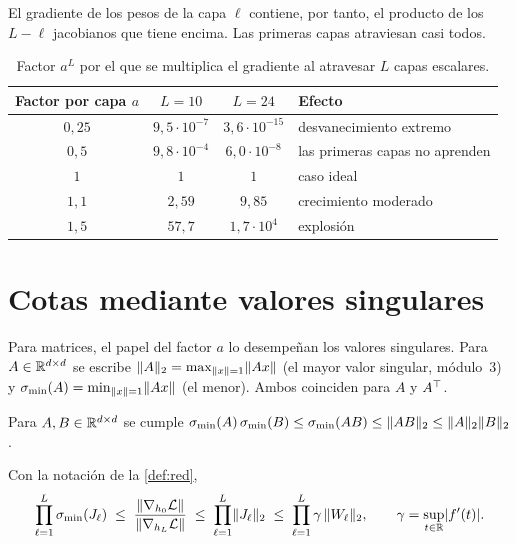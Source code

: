 El gradiente de los pesos de la capa $\ell$ contiene, por tanto, el producto de los $L-\ell$ jacobianos que tiene encima. Las primeras capas atraviesan casi todos.

\addtocounter{definicion}{1}%

\begin{table}[h]
\centering
\begin{tabular}{@{}cccl@{}}
\toprule
Factor por capa $a$ & $L=10$ & $L=24$ & Efecto \\
\midrule
$0{,}25$ & $9{,}5\cdot 10^{-7}$ & $3{,}6\cdot 10^{-15}$ & desvanecimiento extremo \\
$0{,}5$ & $9{,}8\cdot 10^{-4}$ & $6{,}0\cdot 10^{-8}$ & las primeras capas no aprenden \\
$1$ & $1$ & $1$ & caso ideal \\
$1{,}1$ & $2{,}59$ & $9{,}85$ & crecimiento moderado \\
$1{,}5$ & $57{,}7$ & $1{,}7\cdot 10^{4}$ & explosión \\
\bottomrule
\end{tabular}
\caption{Factor $a^{L}$ por el que se multiplica el gradiente al atravesar $L$ capas escalares.}
\label{tab:factores}
\end{table}

\section{Cotas mediante valores singulares}

Para matrices, el papel del factor $a$ lo desempeñan los valores singulares. Para $A\in\mathbb{R}^{d\times d}$ se escribe $\lVert A\rVert_2=\max_{\lVert x\rVert=1}\lVert Ax\rVert$ (el mayor valor singular, módulo~3) y $\sigma_{\min}(A)=\min_{\lVert x\rVert=1}\lVert Ax\rVert$ (el menor). Ambos coinciden para $A$ y $A^{\top}$.

\begin{lema}\label{lem:producto}
Para $A,B\in\mathbb{R}^{d\times d}$ se cumple $\sigma_{\min}(A)\,\sigma_{\min}(B)\le\sigma_{\min}(AB)\le\lVert AB\rVert_2\le\lVert A\rVert_2\lVert B\rVert_2$.
\end{lema}

\begin{teorema}\label{teo:cotas}
Con la notación de la \cref{def:red},
\[
\prod_{\ell=1}^{L}\sigma_{\min}(J_\ell)\;\le\;\frac{\lVert\nabla_{h_0}\mathcal{L}\rVert}{\lVert\nabla_{h_L}\mathcal{L}\rVert}\;\le\;\prod_{\ell=1}^{L}\lVert J_\ell\rVert_2\;\le\;\prod_{\ell=1}^{L}\gamma\,\lVert W_\ell\rVert_2,
\qquad \gamma=\sup_{t\in\mathbb{R}}\lvert f'(t)\rvert .
\]
\end{teorema}

